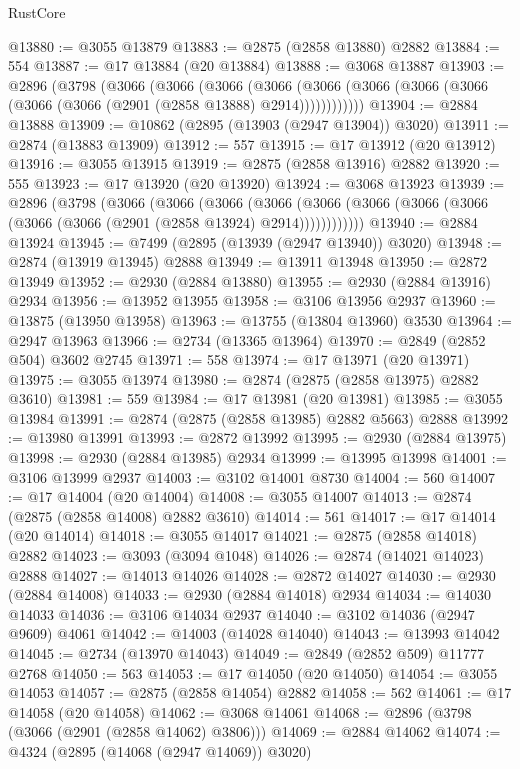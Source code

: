 \begin{lexlean}{RustCore}
\begin{coremodule}
@13880 := @3055 @13879
@13883 := @2875 (@2858 @13880) @2882
@13884 := 554
@13887 := @17 @13884 (@20 @13884)
@13888 := @3068 @13887
@13903 := @2896
    (@3798
      (@3066
        (@3066
          (@3066
            (@3066 (@3066 (@3066 (@3066 (@3066 (@3066 (@3066 (@2901 (@2858 @13888) @2914))))))))))))
@13904 := @2884 @13888
@13909 := @10862 (@2895 (@13903 (@2947 @13904)) @3020)
@13911 := @2874 (@13883 @13909)
@13912 := 557
@13915 := @17 @13912 (@20 @13912)
@13916 := @3055 @13915
@13919 := @2875 (@2858 @13916) @2882
@13920 := 555
@13923 := @17 @13920 (@20 @13920)
@13924 := @3068 @13923
@13939 := @2896
    (@3798
      (@3066
        (@3066
          (@3066
            (@3066 (@3066 (@3066 (@3066 (@3066 (@3066 (@3066 (@2901 (@2858 @13924) @2914))))))))))))
@13940 := @2884 @13924
@13945 := @7499 (@2895 (@13939 (@2947 @13940)) @3020)
@13948 := @2874 (@13919 @13945) @2888
@13949 := @13911 @13948
@13950 := @2872 @13949
@13952 := @2930 (@2884 @13880)
@13955 := @2930 (@2884 @13916) @2934
@13956 := @13952 @13955
@13958 := @3106 @13956 @2937
@13960 := @13875 (@13950 @13958)
@13963 := @13755 (@13804 @13960) @3530
@13964 := @2947 @13963
@13966 := @2734 (@13365 @13964)
@13970 := @2849 (@2852 @504) @3602 @2745
@13971 := 558
@13974 := @17 @13971 (@20 @13971)
@13975 := @3055 @13974
@13980 := @2874 (@2875 (@2858 @13975) @2882 @3610)
@13981 := 559
@13984 := @17 @13981 (@20 @13981)
@13985 := @3055 @13984
@13991 := @2874 (@2875 (@2858 @13985) @2882 @5663) @2888
@13992 := @13980 @13991
@13993 := @2872 @13992
@13995 := @2930 (@2884 @13975)
@13998 := @2930 (@2884 @13985) @2934
@13999 := @13995 @13998
@14001 := @3106 @13999 @2937
@14003 := @3102 @14001 @8730
@14004 := 560
@14007 := @17 @14004 (@20 @14004)
@14008 := @3055 @14007
@14013 := @2874 (@2875 (@2858 @14008) @2882 @3610)
@14014 := 561
@14017 := @17 @14014 (@20 @14014)
@14018 := @3055 @14017
@14021 := @2875 (@2858 @14018) @2882
@14023 := @3093 (@3094 @1048)
@14026 := @2874 (@14021 @14023) @2888
@14027 := @14013 @14026
@14028 := @2872 @14027
@14030 := @2930 (@2884 @14008)
@14033 := @2930 (@2884 @14018) @2934
@14034 := @14030 @14033
@14036 := @3106 @14034 @2937
@14040 := @3102 @14036 (@2947 @9609) @4061
@14042 := @14003 (@14028 @14040)
@14043 := @13993 @14042
@14045 := @2734 (@13970 @14043)
@14049 := @2849 (@2852 @509) @11777 @2768
@14050 := 563
@14053 := @17 @14050 (@20 @14050)
@14054 := @3055 @14053
@14057 := @2875 (@2858 @14054) @2882
@14058 := 562
@14061 := @17 @14058 (@20 @14058)
@14062 := @3068 @14061
@14068 := @2896 (@3798 (@3066 (@2901 (@2858 @14062) @3806)))
@14069 := @2884 @14062
@14074 := @4324 (@2895 (@14068 (@2947 @14069)) @3020)

\end{coremodule}
\end{lexlean}
